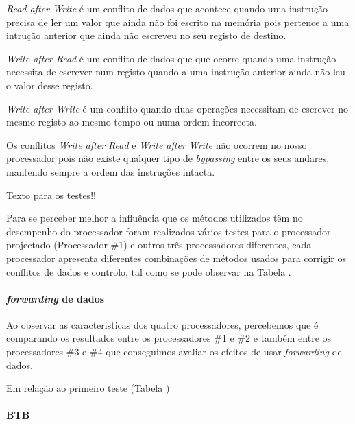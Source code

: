 \textit{Read after Write} é um conflito de dados que acontece quando uma instrução precisa de ler um valor que ainda não foi escrito na memória pois pertence a uma intrução anterior que ainda não escreveu no seu registo de destino.

\textit{Write after Read} é um conflito de dados que que ocorre quando uma instrução necessita de escrever num registo quando a uma instrução anterior ainda não leu o valor desse registo.

\textit{Write after Write} é um conflito quando duas operações necessitam de escrever no mesmo registo ao mesmo tempo ou numa ordem incorrecta.

Os conflitos \textit{Write after Read} e \textit{Write after Write} não ocorrem no nosso processador pois não existe qualquer tipo de \textit{bypassing} entre os seus andares, mantendo sempre a ordem das instruções intacta. 



Texto para os testes!!

Para se perceber melhor a influência que os métodos utilizados têm no desempenho do processador foram realizados vários testes para o processador projectado (Processador \#1) e outros três processadores diferentes, cada processador apresenta diferentes combinações de métodos usados para corrigir os conflitos de dados e controlo, tal como se pode observar na Tabela .

\paragraph{\textit{forwarding} de dados}
Ao observar as caracteristicas dos quatro processadores, percebemos que é comparando os resultados entre os processadores \#1 e \#2 e também entre os processadores \#3 e \#4 que conseguimos avaliar os efeitos de usar \textit{forwarding} de dados.

Em relação ao primeiro teste (Tabela )


\paragraph{BTB}